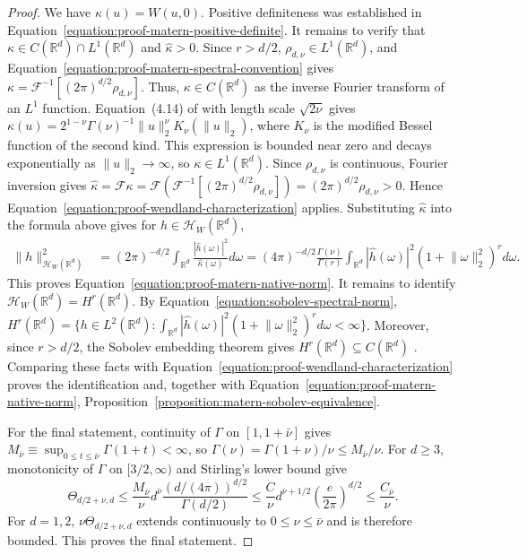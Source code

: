 \documentclass[letterpaper,12pt]{article}
\theoremstyle{definition}
\numberwithin{equation}{section}
\newcommand{\mc}{\mathcal}
\newcommand{\norm}[1]{\lVert#1\rVert}
\begin{document}
\begin{proof}
We have $\kappa(u)=W(u,0)$.
Positive definiteness was established in Equation~\eqref{equation:proof-matern-positive-definite}. It remains to verify that $\kappa\in C(\mathbb R^d)\cap L^1(\mathbb R^d)$ and $\widehat\kappa>0$. Since $r>d/2$, $\rho_{d,\nu}\in L^1(\mathbb R^d)$, and Equation~\eqref{equation:proof-matern-spectral-convention} gives $\kappa=\mathcal F^{-1}[(2\pi)^{d/2}\rho_{d,\nu}]$. Thus, $\kappa\in C(\mathbb R^d)$ as the inverse Fourier transform of an $L^1$ function. Equation~(4.14) of \citet{rasmussen2006gaussian} with length scale $\sqrt{2\nu}$ gives $\kappa(u)=2^{1-\nu}\Gamma(\nu)^{-1}\norm{u}_2^\nu K_\nu(\norm{u}_2)$, where $K_\nu$ is the modified Bessel function of the second kind. This expression is bounded near zero and decays exponentially as $\norm{u}_2\to\infty$, so $\kappa\in L^1(\mathbb R^d)$. Since $\rho_{d,\nu}$ is continuous, Fourier inversion gives $\widehat\kappa=\mathcal F\kappa=\mathcal F\left(\mathcal F^{-1}[(2\pi)^{d/2}\rho_{d,\nu}]\right)=(2\pi)^{d/2}\rho_{d,\nu}>0$. Hence Equation~\eqref{equation:proof-wendland-characterization} applies. Substituting $\widehat\kappa$ into the formula above gives for $h\in\mc H_W(\mathbb R^d)$,
\begin{align*}
\norm{h}_{\mc H_W(\mathbb R^d)}^2&=(2\pi)^{-d/2}\int_{\mathbb R^d}\frac{|\widehat h(\omega)|^2}{\widehat\kappa(\omega)}d\omega =(4\pi)^{-d/2}\frac{\Gamma(\nu)}{\Gamma(r)}\int_{\mathbb R^d}|\widehat h(\omega)|^2(1+\norm{\omega}_2^2)^r d\omega.
\end{align*}
This proves Equation~\eqref{equation:proof-matern-native-norm}. It remains to identify $\mc H_W(\mathbb R^d)=H^r(\mathbb R^d)$. By Equation~\eqref{equation:sobolev-spectral-norm}, $H^r(\mathbb R^d)=\{h\in L^2(\mathbb R^d):\int_{\mathbb R^d}|\widehat h(\omega)|^2(1+\norm{\omega}_2^2)^r d\omega<\infty\}$. Moreover, since $r>d/2$, the Sobolev embedding theorem gives $H^r(\mathbb R^d)\subseteq C(\mathbb R^d)$ \citep{taylor2011partial}. Comparing these facts with Equation~\eqref{equation:proof-wendland-characterization} proves the identification and, together with Equation~\eqref{equation:proof-matern-native-norm}, Proposition~\ref{proposition:matern-sobolev-equivalence}.

For the final statement, continuity of $\Gamma$ on $[1,1+\bar\nu]$ gives $M_{\bar\nu}\equiv\sup_{0\leq t\leq\bar\nu}\Gamma(1+t)<\infty$, so $\Gamma(\nu)=\Gamma(1+\nu)/\nu\leq M_{\bar\nu}/\nu$. For $d\geq3$, monotonicity of $\Gamma$ on $[3/2,\infty)$ and Stirling's lower bound give
\begin{equation*}
\Theta_{d/2+\nu,d}\leq\frac{M_{\bar\nu}}\nu d^{\bar\nu}\frac{(d/(4\pi))^{d/2}}{\Gamma(d/2)}\leq\frac C\nu d^{\bar\nu+1/2}\left(\frac e{2\pi}\right)^{d/2}\leq\frac{C_{\bar\nu}}\nu.
\end{equation*}
For $d=1,2$, $\nu\Theta_{d/2+\nu,d}$ extends continuously to $0\leq\nu\leq\bar\nu$ and is therefore bounded. This proves the final statement.
\end{proof}
\end{document}
